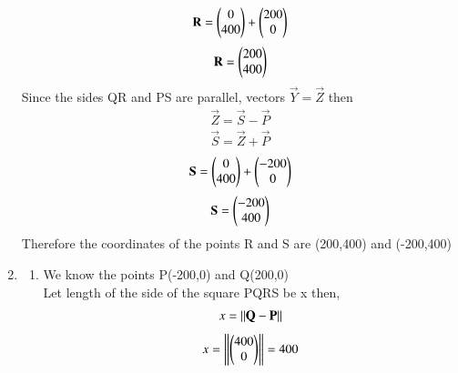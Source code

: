 \documentclass[journal]{IEEEtran}
\begin{document}
\begin{enumerate}[label=(\alph*)]
            \begin{align}
                \mathbf{R}=\begin{pmatrix}0\\400\end{pmatrix}+\begin{pmatrix}200\\0\end{pmatrix}
            \end{align}
            \begin{align}
                \mathbf{R}=\begin{pmatrix}200\\400\end{pmatrix}
            \end{align}
            Since the sides QR and PS are parallel, vectors $\vec{Y}=\vec{Z}$ then
            \begin{align}
                \vec{Z}=\vec{S}-\vec{P}
            \end{align}
            \begin{align}
                \vec{S}=\vec{Z}+\vec{P}
            \end{align}
            \begin{align}
                \mathbf{S}=\begin{pmatrix}0\\400\end{pmatrix}+\begin{pmatrix}-200\\0\end{pmatrix}
            \end{align}
            \begin{align}
                \mathbf{S}=\begin{pmatrix}-200\\400\end{pmatrix}
            \end{align}
            Therefore the coordinates of the points R and S are (200,400) and (-200,400)
            \item
            \begin{enumerate}[label=(\roman*)]
                \item We know the points P(-200,0) and Q(200,0)\\
                   Let length of the side of the square PQRS be x then,
                   \begin{align}
                       x=\left\lVert\mathbf{Q}-\mathbf{P}\right\rVert
                   \end{align}
                   \begin{align}
                       x=\left\lVert\begin{pmatrix}400\\0\end{pmatrix}\right\rVert=400
                   \end{align}\\
                

\end{enumerate}
\end{enumerate}
\end{document}
